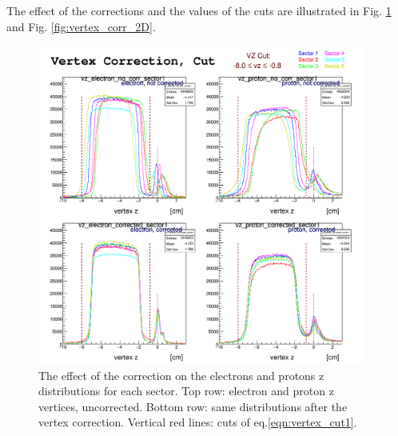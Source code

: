 The effect of the corrections and the values of the cuts are illustrated in 
Fig. \ref{fig:vertex_corr} and  Fig. \ref{fig:vertex_corr_2D}.

\begin{figure}[h]
	\centering
		\includegraphics[width=0.96\textwidth ]{img/vtx_all_sector.png}
			\caption{The effect of the correction on the electrons and protons z 
						distributions for each sector. Top row: electron and proton
						z vertices, uncorrected. Bottom row: same distributions after
						the vertex correction. Vertical red lines: cuts of eq.\ref{eqn:vertex_cut1}. }
			\label{fig:vertex_corr}
\end{figure}

